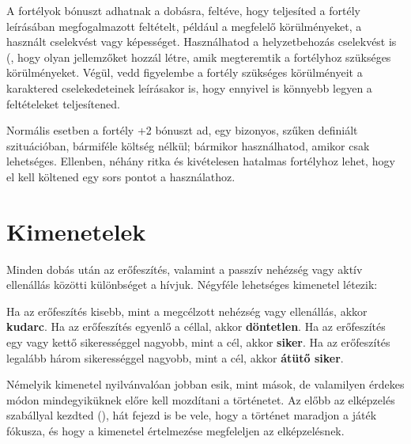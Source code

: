 A fortélyok bónuszt adhatnak a dobásra, feltéve, hogy teljesíted a fortély leírásában megfogalmazott feltételt, például a megfelelő körülményeket, a használt cselekvést vagy képességet. Használhatod a helyzetbehozás cselekvést is (, hogy olyan jellemzőket hozzál létre, amik megteremtik a fortélyhoz szükséges körülményeket. Végül, vedd figyelembe a fortély szükséges körülményeit a karaktered cselekedeteinek leírásakor is, hogy ennyivel is könnyebb legyen a feltételeket teljesítened.

Normális esetben a fortély +2 bónuszt ad, egy bizonyos, szűken definiált szituációban, bármiféle költség nélkül; bármikor használhatod, amikor csak lehetséges. Ellenben, néhány ritka és kivételesen hatalmas fortélyhoz lehet, hogy el kell költened egy sors pontot a használathoz.

\section{Kimenetelek}

Minden dobás után az erőfeszítés, valamint a passzív nehézség vagy aktív ellenállás közötti különbséget a  hívjuk. Négyféle lehetséges kimenetel létezik:

\begin{itemize}
    \failureitem Ha az erőfeszítés kisebb, mint a megcélzott nehézség vagy ellenállás, akkor \textbf{kudarc}.
    \tieitem Ha az erőfeszítés egyenlő a céllal, akkor \textbf{döntetlen}.
    \successitem Ha az erőfeszítés egy vagy kettő sikerességgel nagyobb, mint a cél, akkor \textbf{siker}.
    \successwithstyleitem Ha az erőfeszítés legalább három sikerességgel nagyobb, mint a cél, akkor \textbf{átütő siker}.
\end{itemize}

Némelyik kimenetel nyilvánvalóan jobban esik, mint mások, de valamilyen érdekes módon mindegyiküknek előre kell mozdítani a történetet. Az előbb az elképzelés szabállyal kezdted (), hát fejezd is be vele, hogy a történet maradjon a játék fókusza, és hogy a kimenetel értelmezése megfeleljen az elképzelésnek.


\newpage


